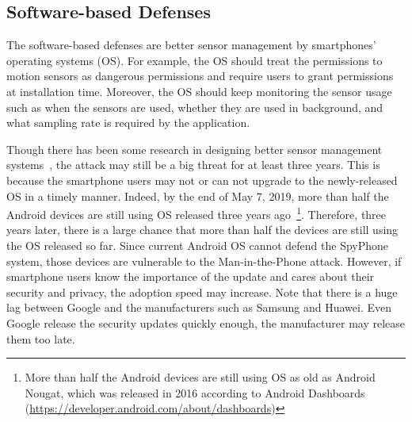 \subsection{Software-based Defenses}
The software-based defenses are better sensor management by smartphones' operating systems (OS). For example, the OS should treat the permissions to motion sensors as dangerous permissions and require users to grant permissions at installation time. Moreover, the OS should keep monitoring the sensor usage such as when the sensors are used, whether they are used in background, and what sampling rate is required by the application. 


Though there has been some research in designing better sensor management systems~\cite{sikder20176thsense}, the {\attackName} attack may still be a big threat for at least three years. This is because the smartphone users may not or can not upgrade to the 
newly-released OS in a timely manner. 
%
Indeed, by the end of May 7, 2019, more than half the Android devices are still using OS released three years ago~\footnote{More than half the Android devices are still using OS as old as Android Nougat, which was released in 2016 according to Android Dashboards (\url{https://developer.android.com/about/dashboards})}. Therefore, three years later, there is a large chance that more than half the devices are still using the OS released so far. Since current Android OS cannot defend the SpyPhone system, those devices are vulnerable to the Man-in-the-Phone attack. However, if smartphone users know the importance of the update and cares about their security and privacy, the adoption speed may increase. Note that there is a huge lag between Google and the manufacturers such as Samsung and Huawei. Even Google release the security updates quickly enough, the manufacturer may release them too late.

